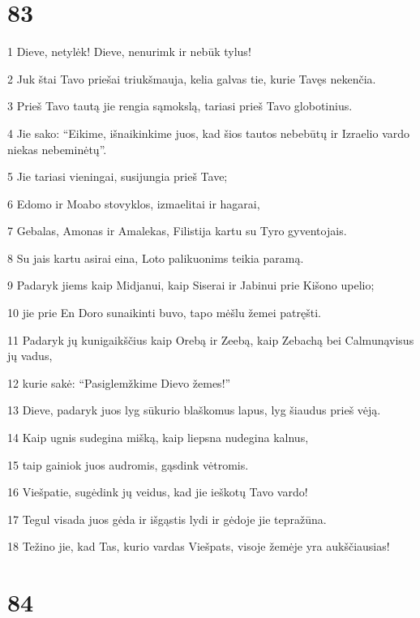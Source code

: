 \chapter{83}


\par 1 Dieve, netylėk! Dieve, nenurimk ir nebūk tylus! 
\par 2 Juk štai Tavo priešai triukšmauja, kelia galvas tie, kurie Tavęs nekenčia. 
\par 3 Prieš Tavo tautą jie rengia sąmokslą, tariasi prieš Tavo globotinius. 
\par 4 Jie sako: “Eikime, išnaikinkime juos, kad šios tautos nebebūtų ir Izraelio vardo niekas nebeminėtų”. 
\par 5 Jie tariasi vieningai, susijungia prieš Tave; 
\par 6 Edomo ir Moabo stovyklos, izmaelitai ir hagarai, 
\par 7 Gebalas, Amonas ir Amalekas, Filistija kartu su Tyro gyventojais. 
\par 8 Su jais kartu asirai eina, Loto palikuonims teikia paramą. 
\par 9 Padaryk jiems kaip Midjanui, kaip Siserai ir Jabinui prie Kišono upelio; 
\par 10 jie prie En Doro sunaikinti buvo, tapo mėšlu žemei patręšti. 
\par 11 Padaryk jų kunigaikščius kaip Orebą ir Zeebą, kaip Zebachą bei Calmuną­visus jų vadus, 
\par 12 kurie sakė: “Pasiglemžkime Dievo žemes!” 
\par 13 Dieve, padaryk juos lyg sūkurio blaškomus lapus, lyg šiaudus prieš vėją. 
\par 14 Kaip ugnis sudegina mišką, kaip liepsna nudegina kalnus, 
\par 15 taip gainiok juos audromis, gąsdink vėtromis. 
\par 16 Viešpatie, sugėdink jų veidus, kad jie ieškotų Tavo vardo! 
\par 17 Tegul visada juos gėda ir išgąstis lydi ir gėdoje jie tepražūna. 
\par 18 Težino jie, kad Tas, kurio vardas Viešpats, visoje žemėje yra aukščiausias!


\chapter{84}


